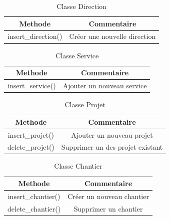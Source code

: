 \documentclass{report}
\begin{document}
\begin{table}[h!]
    \begin{center}
        \begin{tabular}{|c|c|}
            \hline
            \textbf{Methode} & \textbf{Commentaire}  \\
            \hline
            insert\_direction() & Créer une nouvelle direction \\
            \hline
        \end{tabular}
    \end{center}
\caption{Classe Direction}
\end{table}

\begin{table}[h!]
    \begin{center}
        \begin{tabular}{|c|c|}
            \hline
            \textbf{Methode} & \textbf{Commentaire}  \\
            \hline
            insert\_service() & Ajouter un nouveau service \\
            \hline
        \end{tabular}
    \end{center}
\caption{Classe Service}
\end{table}

\begin{table}[h!]
    \begin{center}
        \begin{tabular}{|c|c|}
            \hline
            \textbf{Methode} & \textbf{Commentaire}  \\
            \hline
            insert\_projet() & Ajouter un nouveau projet\\
            \hline
            delete\_projet()  & Supprimer un des projet existant\\
            \hline
        \end{tabular}
    \end{center}
\caption{Classe Projet}
\end{table}

\begin{table}[h!]
    \begin{center}
        \begin{tabular}{|c|c|}
            \hline
            \textbf{Methode} & \textbf{Commentaire}  \\
            \hline
            insert\_chantier() & Créer un nouveau chantier\\
            \hline
            delete\_chantier()  & Supprimer un chantier\\
            \hline
        \end{tabular}
    \end{center}
\caption{Classe Chantier}
\end{table}
\end{document}
